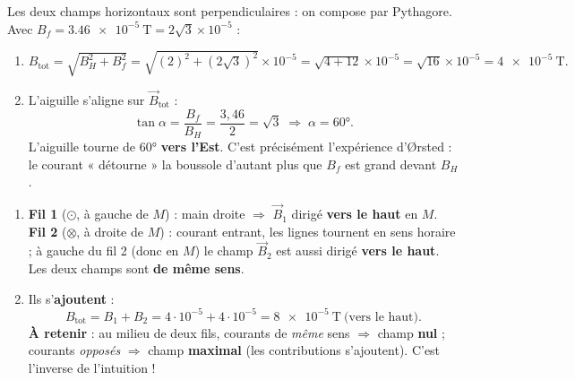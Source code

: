 \documentclass[11pt,a4paper]{article}
\newcommand{\vv}[1]{\vec{#1}}\newcommand{\ds}{\displaystyle}
\begin{document}
\begin{corrige}
Les deux champs horizontaux sont perpendiculaires : on compose par Pythagore. Avec
$B_f=\qty{3.46e-5}{\tesla}=2\sqrt{3}\times10^{-5}$ :
\begin{enumerate}[label=\alph*)]
  \item $B_{\text{tot}}=\sqrt{B_H^2+B_f^2}=\sqrt{(2)^2+(2\sqrt3)^2}\times10^{-5}
        =\sqrt{4+12}\times10^{-5}=\sqrt{16}\times10^{-5}=\qty{4e-5}{\tesla}.$
  \item L'aiguille s'aligne sur $\vv{B}_{\text{tot}}$ :
        \[ \tan\alpha=\frac{B_f}{B_H}=\frac{3{,}46}{2}=\sqrt{3}\;\Rightarrow\;\alpha=\ang{60}. \]
        L'aiguille tourne de \ang{60} \textbf{vers l'Est}. C'est précisément l'expérience d'Ørsted :
        le courant « détourne » la boussole d'autant plus que $B_f$ est grand devant $B_H$.
\end{enumerate}
\end{corrige}

\begin{corrige}
\begin{enumerate}[label=\alph*)]
  \item \textbf{Fil 1} ($\odot$, à gauche de $M$) : main droite $\Rightarrow$ $\vv{B}_1$ dirigé
        \textbf{vers le haut} en $M$. \textbf{Fil 2} ($\otimes$, à droite de $M$) : courant entrant,
        les lignes tournent en sens horaire ; à gauche du fil 2 (donc en $M$) le champ $\vv{B}_2$ est
        aussi dirigé \textbf{vers le haut}. Les deux champs sont \textbf{de même sens}.
  \item Ils s'\textbf{ajoutent} :
        \[ B_{\text{tot}}=B_1+B_2=4\cdot10^{-5}+4\cdot10^{-5}=\qty{8e-5}{\tesla}\ \text{(vers le haut).} \]
        \textbf{À retenir} : au milieu de deux fils, courants de \emph{même} sens $\Rightarrow$ champ
        \textbf{nul} ; courants \emph{opposés} $\Rightarrow$ champ \textbf{maximal} (les contributions
        s'ajoutent). C'est l'inverse de l'intuition !
\end{enumerate}
\end{corrige}
\end{document}
